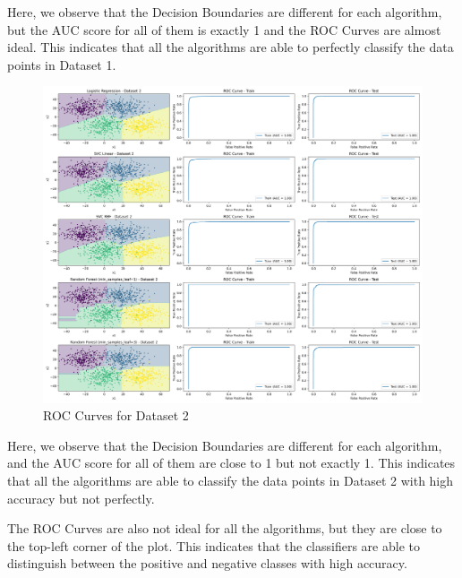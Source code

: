 Here, we observe that the Decision Boundaries are different for each algorithm, but the AUC score for all of them is exactly 1 and the ROC Curves are almost ideal. This indicates that all the algorithms are able to perfectly classify the data points in Dataset 1. 

\begin{figure}[H]
    \centering
    \includegraphics[width=\textwidth]{Images/dataset-2-roc-curves-1.png}
    \caption{ROC Curves for Dataset 2}
\end{figure}

Here, we observe that the Decision Boundaries are different for each algorithm, and the AUC score for all of them are close to 1 but not exactly 1. This indicates that all the algorithms are able to classify the data points in Dataset 2 with high accuracy but not perfectly.

The ROC Curves are also not ideal for all the algorithms, but they are close to the top-left corner of the plot. This indicates that the classifiers are able to distinguish between the positive and negative classes with high accuracy.

